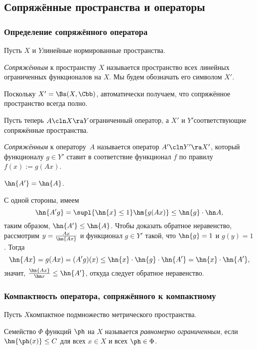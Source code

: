\documentclass[a4paper]{article}
\begin{document}
\subsection{Сопряжённые пространства и операторы}

\subsubsection{Определение сопряжённого оператора}

Пусть $X$ и $Y$\т линейные нормированные пространства.

\begin{df}
\emph{Сопряжённым} к пространству $X$ называется пространство всех
линейных ограниченных функционалов на $X$. Мы будем обозначать его символом $X'$.
\end{df}

Поскольку $X' = \Bs(X, \Cbb)$, автоматически получаем, что сопряжённое пространство всегда
полно.

Пусть теперь $A\cln X \ra Y$\т ограниченный оператор, а $X'$ и $Y'$\т соответствующие сопряжённые пространства.

\begin{df}
\emph{Сопряжённым} к оператору~$A$ называется оператор $A'\cln Y' \ra X'$, который функционалу
$g \in Y'$ ставит в соответствие функционал $f$ по правилу $f(x) := g(Ax)$.
\end{df}

\begin{stm}
$\hn{A'} = \hn{A}$.
\end{stm}
С одной стороны, имеем
$$\hn{A'g} = \supl{\hn{x} \le 1} \hm{g(Ax)} \le \hn{g}\cdot \hn A,$$
таким образом, $\hn{A'} \le \hn{A}$. Чтобы доказать обратное неравенство,
рассмотрим $y = \frac{Ax}{\hn{Ax}}$ и функционал $g \in Y'$ такой, что
$\hn{g} = 1$ и $g(y) = 1$. Тогда
$$\hn{Ax} = g(Ax) = (A'g)(x)  \le \hn{x} \cdot \hn{g} \cdot \hn{A'} = \hn{x} \cdot \hn{A'},$$
значит, $\frac{\hn{Ax}}{\hn x} \le \hn{A'}$,
откуда следует обратное неравенство.

\subsubsection{Компактность оператора, сопряжённого к компактному}

Пусть $X$\т компактное подмножество метрического пространства.

\begin{df}
Семейство $\Phi$ функций $\ph$ на $X$ называется \emph{равномерно ограниченным},
если $\hm{\ph(x)} \le C$ для всех $x \in X$ и всех $\ph \in \Phi$.
\end{df}
\end{document}
